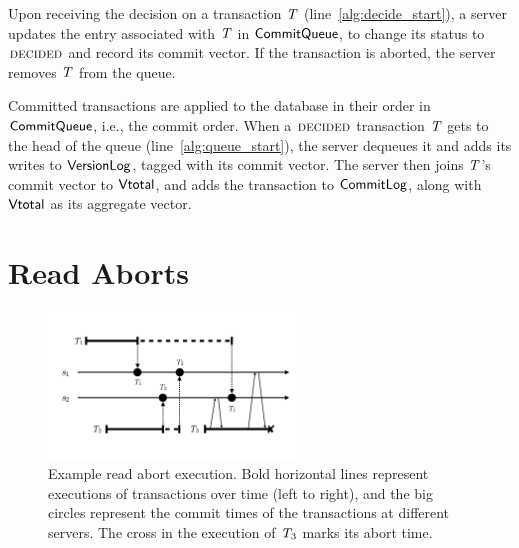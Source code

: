 Upon receiving the decision on a transaction $\mathit{T}$ (line~\ref{alg:decide_start}), a server updates the entry associated with $\mathit{T}$ in $\mathsf{CommitQueue}$, to change its status to $\text{\sc decided}$ and record its commit vector. If the transaction is aborted, the server removes $\mathit{T}$ from the queue.

Committed transactions are applied to the database in their order in $\mathsf{CommitQueue}$, i.e., the commit order. When a $\text{\sc decided}$ transaction $\mathit{T}$ gets to the head of the queue (line~\ref{alg:queue_start}), the server dequeues it and adds its writes to $\mathsf{VersionLog}$, tagged with its commit vector. The server then joins $\mathit{T}$'s commit vector to $\mathsf{Vtotal}$, and adds the transaction to $\mathsf{CommitLog}$, along with $\mathsf{Vtotal}$ as its aggregate vector.

\section{Read Aborts}


\begin{figure}[h]
  \centering
  \includegraphics[width=0.6\textwidth]{figures/ch4_abort_execution.pdf}
  \vspace{-0.5cm}
\caption{Example read abort execution. Bold horizontal lines represent executions of transactions over time (left to right), and the big circles represent the commit times of the transactions at different servers. The cross in the execution of $\mathit{T}_3$ marks its abort time. }
\label{fig:read_abort}
\end{figure}
